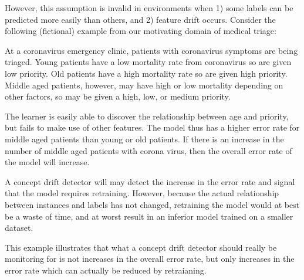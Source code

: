 \noindent However, this assumption is invalid in environments when 1) some labels can be predicted more easily than others, and 2) feature drift occurs. Consider the following (fictional) example from our motivating domain of medical triage:
\begin{displayquote}
    At a coronavirus emergency clinic, patients with coronavirus symptoms are being triaged. Young patients have a low mortality rate from coronavirus so are given low priority. Old patients have a high mortality rate so are given high priority. Middle aged patients, however, may have high or low mortality depending on other factors, so may be given a high, low, or medium priority. 
    
    The learner is easily able to discover the relationship between age and priority, but fails to make use of other features. The model thus has a higher error rate for middle aged patients than young or old patients. If there is an increase in the number of middle aged patients with corona virus, then the overall error rate of the model will increase.  
    
    A concept drift detector will may detect the increase in the error rate and signal that the model requires retraining. However, because the actual relationship between instances and labels has not changed, retraining the model would at best be a waste of time, and at worst result in an inferior model trained on a smaller dataset. 
\end{displayquote}
This example illustrates that what a concept drift detector should really be monitoring for is not increases in the overall error rate, but only increases in the error rate which can actually be reduced by retraianing. 

